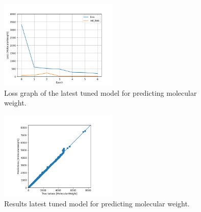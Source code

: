     \begin{figure}
        \centering
        \includegraphics[width=0.5\textwidth]{model_20_7_epochs_loss_MolecularWeight.png}
        \caption{Loss graph of the latest tuned model for predicting molecular weight.}
        \label{fig:model20-mol-weight-loss}
    \end{figure}
    \begin{figure}
        \centering
        \includegraphics[width=0.5\textwidth]{model_20_7_epochs_predictions_MolecularWeight.png}
        \caption{Results latest tuned model for predicting molecular weight.}
        \label{fig:model20-mol-weight-predictions}
    \end{figure}
    
